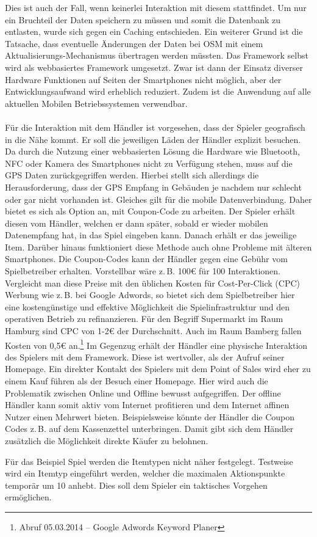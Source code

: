 Dies ist auch der Fall, wenn keinerlei Interaktion mit diesem stattfindet. Um nur ein Bruchteil der Daten speichern zu müssen und somit die Datenbank zu entlasten, wurde sich gegen ein Caching entschieden. Ein weiterer Grund ist die Tatsache, dass eventuelle Änderungen der Daten bei OSM mit einem Aktualisierungs-Mechanismus übertragen werden müssten.
Das Framework selbst wird als webbasiertes Framework umgesetzt.
Zwar ist dann der Einsatz diverser Hardware Funktionen auf Seiten der Smartphones nicht möglich, aber der Entwicklungsaufwand wird erheblich reduziert. Zudem ist die Anwendung auf alle aktuellen Mobilen Betriebssystemen verwendbar.
\\\\
Für die Interaktion mit dem Händler ist vorgesehen, dass der Spieler geografisch in die Nähe kommt. Er soll die jeweiligen Läden der Händler explizit besuchen. Da durch die Nutzung einer webbasierten Lösung die Hardware wie Bluetooth, NFC oder Kamera des Smartphones nicht zu Verfügung stehen, muss auf die GPS Daten zurückgegriffen werden.
Hierbei stellt sich allerdings die Herausforderung, dass der GPS Empfang in Gebäuden je nachdem nur schlecht oder gar nicht vorhanden ist. Gleiches gilt für die mobile Datenverbindung. Daher bietet es sich als Option an, mit Coupon-Code zu arbeiten. Der Spieler erhält diesen vom Händler, welchen er dann später, sobald er wieder mobilen Datenempfang hat, in das Spiel eingeben kann. Danach erhält er das jeweilige Item. Darüber hinaus funktioniert diese Methode auch ohne Probleme mit älteren Smartphones. Die Coupon-Codes kann der Händler gegen eine Gebühr vom Spielbetreiber erhalten. Vorstellbar wäre z.\,B. 100€ für 100 Interaktionen. Vergleicht man diese Preise mit den üblichen Kosten für Cost-Per-Click (CPC) Werbung wie z.\,B. bei Google Adwords, so bietet sich dem Spielbetreiber hier eine kostengünstige und effektive Möglichkeit die Spielinfrastruktur und den operativen Betrieb zu refinanzieren.\cite{Guerini.2010} Für den Begriff Supermarkt im Raum Hamburg sind CPC von 1-2€ der Durchschnitt. Auch im Raum Bamberg fallen Kosten von 0,5€ an.\footnote{Abruf 05.03.2014 -- Google Adwords Keyword Planer} Im Gegenzug erhält der Händler eine physische Interaktion des Spielers mit dem Framework. Diese ist wertvoller, als der Aufruf seiner Homepage. Ein direkter Kontakt des Spielers mit dem Point of Sales wird eher zu einem Kauf führen als der Besuch einer Homepage. Hier wird auch die Problematik zwischen Online und Offline bewusst aufgegriffen. Der offline Händler kann somit aktiv vom Internet profitieren und dem Internet affinen Nutzer einen Mehrwert bieten. Beispielsweise könnte  der Händler die Coupon Codes z.\,B. auf dem Kassenzettel unterbringen. Damit gibt sich dem Händler zusätzlich die Möglichkeit direkte Käufer zu belohnen.

Für das Beispiel Spiel werden die Itemtypen nicht näher festgelegt. Testweise wird ein Itemtyp eingeführt werden, welcher die maximalen Aktionspunkte temporär um 10 anhebt. Dies soll dem Spieler ein taktisches Vorgehen ermöglichen.
